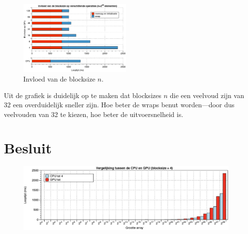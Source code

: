 \documentclass[10pt, twocolumn, a4paper]{article}
\begin{document}
\begin{figure}
\centering
\includegraphics[width=0.5\textwidth]{blocksize.eps}
\caption{Invloed van de blocksize $n$.}
\label{blocksize}
\end{figure}

Uit de grafiek is duidelijk op te maken dat blocksizes $n$ die een veelvoud zijn van 32 een overduidelijk sneller zijn. Hoe beter de wraps benut worden---door dus veelvouden van 32 te kiezen, hoe beter de uitvoersnelheid is.



\section{Besluit}


\begin{figure}
\includegraphics[width=\textwidth]{comp_4.eps}
\end{figure}


\onecolumn

\appendix
\end{document}
